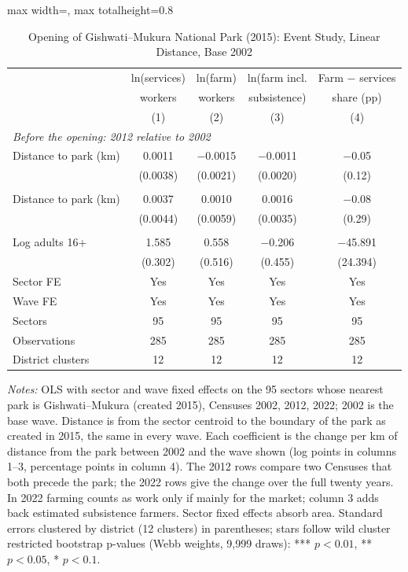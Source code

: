\documentclass[11pt]{article}
\begin{document}
\begin{table}[H]
\centering\footnotesize\setlength{\tabcolsep}{4pt}
\caption{Opening of Gishwati--Mukura National Park (2015): Event Study, Linear Distance, Base 2002}
\label{tab:gm_linear_2002}
\begin{adjustbox}{max width=\textwidth, max totalheight=0.8\textheight}
\begin{tabular}{lcccc}
\toprule
 & ln(services) & ln(farm) & ln(farm incl. & Farm $-$ services \\
 & workers & workers & subsistence) & share (pp) \\
 & (1) & (2) & (3) & (4) \\
\midrule
\multicolumn{5}{l}{\textit{Before the opening: 2012 relative to 2002}} \\
\quad Distance to park (km) & 0.0011 & $-$0.0015 & $-$0.0011 & $-$0.05 \\
 & (0.0038) & (0.0021) & (0.0020) & (0.12) \\
\addlinespace
\multicolumn{5}{l}{\textit{After the opening: 2022 relative to 2002}} \\
\quad Distance to park (km) & 0.0037 & 0.0010 & 0.0016 & $-$0.08 \\
 & (0.0044) & (0.0059) & (0.0035) & (0.29) \\
\addlinespace
\multicolumn{5}{l}{\textit{Controls}} \\
\quad Log adults 16+ & 1.585 & 0.558 & $-$0.206 & $-$45.891 \\
 & (0.302) & (0.516) & (0.455) & (24.394) \\
\midrule
Sector FE & Yes & Yes & Yes & Yes \\
Wave FE & Yes & Yes & Yes & Yes \\
Sectors & 95 & 95 & 95 & 95 \\
Observations & 285 & 285 & 285 & 285 \\
District clusters & 12 & 12 & 12 & 12 \\
\bottomrule
\end{tabular}
\end{adjustbox}
\begin{minipage}{0.97\textwidth}\scriptsize
\textit{Notes:} OLS with sector and wave fixed effects on the 95 sectors whose nearest park is Gishwati--Mukura (created 2015), Censuses 2002, 2012, 2022; 2002 is the base wave. Distance is from the sector centroid to the boundary of the park as created in 2015, the same in every wave. Each coefficient is the change per km of distance from the park between 2002 and the wave shown (log points in columns 1--3, percentage points in column 4). The 2012 rows compare two Censuses that both precede the park; the 2022 rows give the change over the full twenty years. In 2022 farming counts as work only if mainly for the market; column 3 adds back estimated subsistence farmers. Sector fixed effects absorb area. Standard errors clustered by district (12 clusters) in parentheses; stars follow wild cluster restricted bootstrap p-values (Webb weights, 9,999 draws): *** $p<0.01$, ** $p<0.05$, * $p<0.1$.
\end{minipage}
\end{table}
\clearpage
\end{document}
